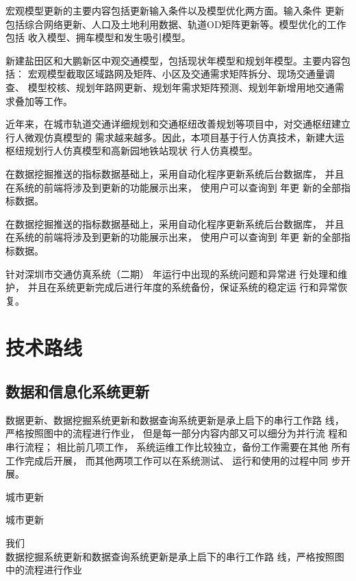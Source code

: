 宏观模型更新的主要内容包括更新输入条件以及模型优化两方面。输入条件
更新包括综合网络更新、人口及土地利用数据、轨道OD矩阵更新等。模型优化的工作包括
收入模型、拥车模型和发生吸引模型。

新建盐田区和大鹏新区中观交通模型，包括现状年模型和规划年模型。主要内容包括：
宏观模型截取区域路网及矩阵、小区及交通需求矩阵拆分、现场交通量调查、
模型校核、规划年路网更新、规划年需求矩阵预测、规划年新增用地交通需求叠加等工作。

近年来，在城市轨道交通详细规划和交通枢纽改善规划等项目中，对交通枢纽建立行人微观仿真模型的
需求越来越多。因此，本项目基于行人仿真技术，新建大运枢纽规划行人仿真模型和高新园地铁站现状
行人仿真模型。

在数据挖掘推送的指标数据基础上，采用自动化程序更新系统后台数据库，
并且在系统的前端将涉及到更新的功能展示出来， 使用户可以查询到 \pyear 年更
新的全部指标数据。

在数据挖掘推送的指标数据基础上，采用自动化程序更新系统后台数据库，
并且在系统的前端将涉及到更新的功能展示出来， 使用户可以查询到 \pyear 年更
新的全部指标数据。

针对深圳市交通仿真系统（二期） \pyear 年运行中出现的系统问题和异常进
行处理和维护， 并且在系统更新完成后进行年度的系统备份，保证系统的稳定运
行和异常恢复。

\section{技术路线}
\subsection{数据和信息化系统更新}
数据更新、数据挖掘系统更新和数据查询系统更新是承上启下的串行工作路
线，严格按照图中的流程进行作业， 但是每一部分内容内部又可以细分为并行流
程和串行流程； 相比前几项工作， 系统运维工作比较独立，备份工作需要在其他
所有工作完成后开展， 而其他两项工作可以在系统测试、 运行和使用的过程中同
步开展。

\begin{feai}
\item 城市更新\\
\item 城市更新\\
\item 我们\\
数据挖掘系统更新和数据查询系统更新是承上启下的串行工作路
线，严格按照图中的流程进行作业
\end{feai}

